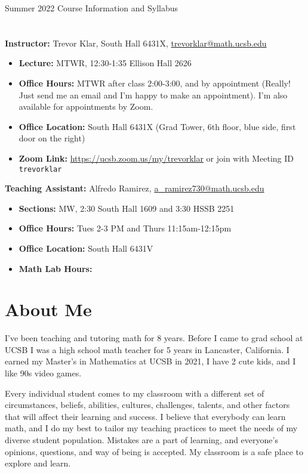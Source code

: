 \documentclass[11pt,letterpaper]{article}
\begin{document}
\thispagestyle{fancy}
\begin{center}
{\Large Summer 2022 Course Information and Syllabus}
\end{center}

\section*{}
\textbf{Instructor:} Trevor Klar, South Hall 6431X, \href{mailto:trevorklar@math.ucsb.edu}{trevorklar@math.ucsb.edu}
\begin{itemize}[nosep]
\item \textbf{Lecture:} MTWR, 12:30-1:35 Ellison Hall 2626
\item \textbf{Office Hours:} MTWR after class 2:00-3:00, and by appointment (Really! Just send me an email and I'm happy to make an appointment). I'm also available for appointments by Zoom.
\item \textbf{Office Location:} South Hall 6431X (Grad Tower, 6th floor, blue side, first door on the right)
\item \textbf{Zoom Link:} \href{https://ucsb.zoom.us/my/trevorklar}{https://ucsb.zoom.us/my/trevorklar} or join with Meeting ID \texttt{trevorklar}
\end{itemize}
\noindent \textbf{Teaching Assistant:} Alfredo Ramirez, \href{mailto:a_ramirez730@math.ucsb.edu}{a{\_}ramirez730@math.ucsb.edu}
\begin{itemize}[nosep]
\item \textbf{Sections:} MW, 2:30 South Hall 1609 and 3:30 HSSB 2251
\item \textbf{Office Hours:} Tues 2-3 PM and Thurs 11:15am-12:15pm
\item \textbf{Office Location:} South Hall 6431V
\item \textbf{Math Lab Hours:}
\end{itemize}

\section*{About Me}
I've been teaching and tutoring math for 8 years. Before I came to grad school at UCSB I was a high school math teacher for 5 years in Lancaster, California. I earned my Master's in Mathematics at UCSB in 2021, I have 2 cute kids, and I like 90s video games.

Every individual student comes to my classroom with a different set of circumstances, beliefs, abilities, cultures, challenges, talents, and other factors that will affect their learning and success. I believe that everybody can learn math, and I do my best to tailor my teaching practices to meet the needs of my diverse student population. Mistakes are a part of learning, and everyone's opinions, questions, and way of being is accepted. My classroom is a safe place to explore and learn.
\end{document}
